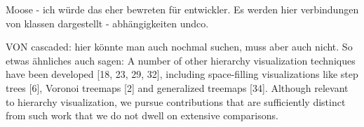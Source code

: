 Moose - ich würde das eher bewreten für entwickler. Es werden hier verbindungen von klassen dargestellt - abhängigkeiten undco.





VON cascaded: hier könnte man auch nochmal suchen, muss aber auch nicht.
So etwas ähnliches auch sagen:
A number of other hierarchy visualization techniques have been
developed [18, 23, 29, 32], including space-filling visualizations
like step trees [6], Voronoi treemaps [2] and generalized treemaps
[34]. Although relevant to hierarchy visualization, we pursue
contributions that are sufficiently distinct from such work that we
do not dwell on extensive comparisons. \cite{lu2008cascaded}